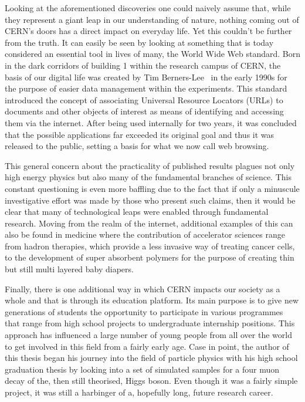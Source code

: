 \hspace{10pt}Looking at the aforementioned discoveries one could naively assume that, while they represent a giant leap in our understanding of nature, nothing coming out of CERN's doors has a direct impact on everyday life. Yet this couldn't be further from the truth. It can easily be seen by looking at something that is today considered an essential tool in lives of many, the World Wide Web standard. Born in the dark corridors of building 1 within the research campus of CERN, the basis of our digital life was created by Tim Berners-Lee~\cite{www_origins} in the early 1990s for the purpose of easier data management within the experiments. This standard introduced the concept of associating Universal Resource Locators (URLs) to documents and other objects of interest as means of identifying and accessing them via the internet. After being used internally for two years, it was concluded that the possible applications far exceeded its original goal and thus it was released to the public, setting a basis for what we now call web browsing.

\hspace{10pt}This general concern about the practicality of published results plagues not only high energy physics but also many of the fundamental branches of science. This constant questioning is even more baffling due to the fact that if only a minuscule investigative effort was made by those who present such claims, then it would be clear that many of technological leaps were enabled through fundamental research. Moving from the realm of the internet, additional examples of this can also be found in medicine where the contribution of accelerator sciences range from hadron therapies, which provide a less invasive way of treating cancer cells, to the development of super absorbent polymers for the purpose of creating thin but still multi layered baby diapers. %

\hspace{10pt} Finally, there is one additional way in which CERN impacts our society as a whole and that is through its education platform. Its main purpose is to give new generations of students the opportunity to participate in various programmes that range from high school projects to undergraduate internship positions. This approach has influenced a large number of young people from all over the world to get involved in this field from a fairly early age. Case in point, the author of this thesis began his journey into the field of particle physics with his high school graduation thesis by looking into a set of simulated samples for a four muon decay of the, then still theorised, Higgs boson. Even though it was a fairly simple project, it was still a harbinger of a, hopefully long, future research career.

